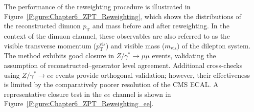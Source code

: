 The performance of the reweighting procedure is illustrated in Figure~\ref{Figure:Chapter6_ZPT_Reweighting}, which shows the distributions of the reconstructed dimuon $p_\text{T}$ and mass before and after reweighting. In the context of the dimuon channel, these observables are also referred to as the visible transverse momentum ($p_\text{T}^\text{vis}$) and visible mass ($m_\text{vis}$) of the dilepton system. The method exhibits good closure in $Z/\gamma^* \to \mu\mu$ events, validating the assumption of reconstructed–generator level agreement. Additional cross-checks using $Z/\gamma^* \to ee$ events provide orthogonal validation; however, their effectiveness is limited by the comparatively poorer resolution of the \ac{CMS} \ac{ECAL}. A representative closure test in the $ee$ channel is shown in Figure~\ref{Figure:Chapter6_ZPT_Reweighting_ee}.

